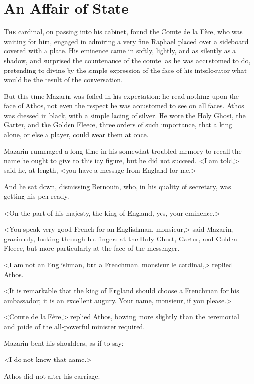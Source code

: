 \chapter{An Affair of State}

\lettrine{T}{he} cardinal, on passing into his cabinet, found the Comte de la Fère, who was waiting for him, engaged in admiring a very fine Raphael placed over a sideboard covered with a plate. His eminence came in softly, lightly, and as silently as a shadow, and surprised the countenance of the comte, as he was accustomed to do, pretending to divine by the simple expression of the face of his interlocutor what would be the result of the conversation.

But this time Mazarin was foiled in his expectation: he read nothing upon the face of Athos, not even the respect he was accustomed to see on all faces. Athos was dressed in black, with a simple lacing of silver. He wore the Holy Ghost, the Garter, and the Golden Fleece, three orders of such importance, that a king alone, or else a player, could wear them at once.

Mazarin rummaged a long time in his somewhat troubled memory to recall the name he ought to give to this icy figure, but he did not succeed. <I am told,> said he, at length, <you have a message from England for me.>

And he sat down, dismissing Bernouin, who, in his quality of secretary, was getting his pen ready.

<On the part of his majesty, the king of England, yes, your eminence.>

<You speak very good French for an Englishman, monsieur,> said Mazarin, graciously, looking through his fingers at the Holy Ghost, Garter, and Golden Fleece, but more particularly at the face of the messenger.

<I am not an Englishman, but a Frenchman, monsieur le cardinal,> replied Athos.

<It is remarkable that the king of England should choose a Frenchman for his ambassador; it is an excellent augury. Your name, monsieur, if you please.>

<Comte de la Fère,> replied Athos, bowing more slightly than the ceremonial and pride of the all-powerful minister required.

Mazarin bent his shoulders, as if to say:—

<I do not know that name.>

Athos did not alter his carriage.

